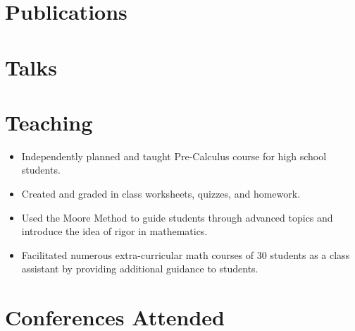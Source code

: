 \documentclass{cultvoucher}
\begin{document}
\section{Publications}

\section{Talks}

\section{Teaching}
\begin{itemize}
	\vspace{-0.25em}
	\item Independently planned and taught Pre-Calculus course for high school
	      students.
	\item Created and graded in class worksheets, quizzes, and homework.
	\item Used the Moore Method to guide students through advanced topics and
	      introduce the idea of rigor in mathematics.
\end{itemize}

\begin{itemize}
	\vspace{-0.25em}
	\item Facilitated numerous extra-curricular math courses of 30 students as
	      a class assistant by providing additional guidance to students.
\end{itemize}

\section{Conferences Attended}




\end{document}
